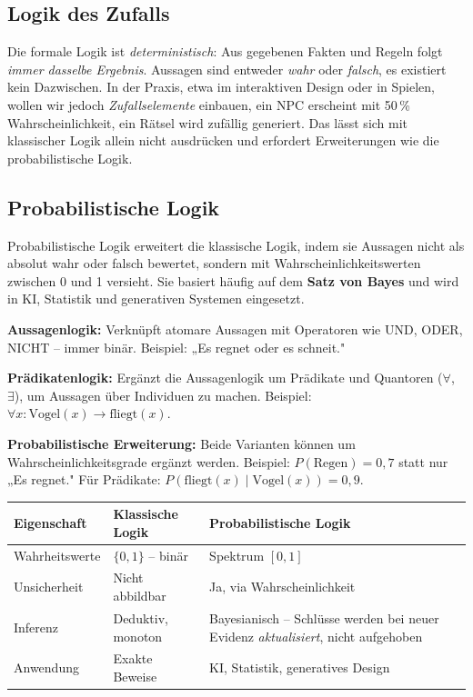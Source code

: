 \documentclass[parskip=half,a4paper,11pt]{scrreprt}
\begin{document}
\subsection{Logik des Zufalls}

Die formale Logik ist \textit{deterministisch}: Aus gegebenen Fakten und Regeln folgt\textit{ immer dasselbe Ergebnis}. Aussagen sind entweder \textit{wahr} oder \textit{falsch}, es existiert kein Dazwischen. In der Praxis, etwa im interaktiven Design oder in Spielen, wollen wir jedoch \textit{Zufallselemente }einbauen, ein NPC erscheint mit 50\,\% Wahrscheinlichkeit, ein Rätsel wird zufällig generiert. Das lässt sich mit klassischer Logik allein nicht ausdrücken und erfordert Erweiterungen wie die probabilistische Logik.


\subsection{Probabilistische Logik}

Probabilistische Logik erweitert die klassische Logik, indem sie Aussagen nicht als absolut wahr oder falsch bewertet, sondern mit Wahrscheinlichkeitswerten zwischen 0 und 1 versieht. Sie basiert häufig auf dem \textbf{Satz von Bayes} und wird in KI, Statistik und generativen Systemen eingesetzt.

\textbf{Aussagenlogik:} Verknüpft atomare Aussagen mit Operatoren wie UND, ODER, NICHT – immer binär. Beispiel: „Es regnet oder es schneit."

\textbf{Prädikatenlogik:} Ergänzt die Aussagenlogik um Prädikate und Quantoren ($\forall$, $\exists$), um Aussagen über Individuen zu machen. Beispiel: $\forall x: \text{Vogel}(x) \rightarrow \text{fliegt}(x)$.

\textbf{Probabilistische Erweiterung:} Beide Varianten können um Wahrscheinlichkeitsgrade ergänzt werden. Beispiel: $P(\text{Regen}) = 0{,}7$ statt nur „Es regnet." Für Prädikate: $P(\text{fliegt}(x) \mid \text{Vogel}(x)) = 0{,}9$.

\begin{center}
\begin{tabular}{lll}
\toprule
\textbf{Eigenschaft} & \textbf{Klassische Logik} & \textbf{Probabilistische Logik} \\
\midrule
Wahrheitswerte & $\{0, 1\}$ -- binär & Spektrum $[0, 1]$ \\
Unsicherheit & Nicht abbildbar & Ja, via Wahrscheinlichkeit \\
Inferenz & Deduktiv, monoton & Bayesianisch -- Schlüsse werden bei neuer Evidenz \textit{aktualisiert}, nicht aufgehoben \\
Anwendung & Exakte Beweise & KI, Statistik, generatives Design \\
\bottomrule
\end{tabular}
\end{center}
\end{document}

